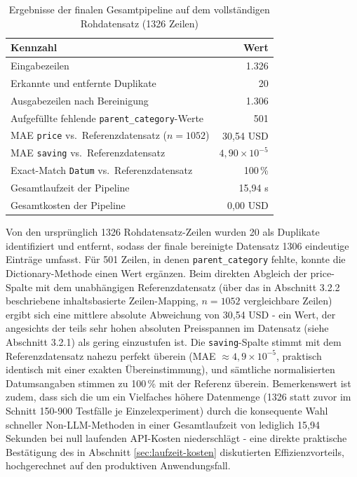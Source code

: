 \begin{table}[htbp]
\centering
\caption{Ergebnisse der finalen Gesamtpipeline auf dem vollständigen Rohdatensatz (1326 Zeilen)}
\label{tab:finale-ergebnisse}
\begin{tabular}{lr}
\toprule
\rowcolor{headerblue}
\textbf{Kennzahl} & \textbf{Wert} \\
\midrule
\rowcolor{lightgray}
Eingabezeilen & 1.326 \\
Erkannte und entfernte Duplikate & 20 \\
\rowcolor{lightgray}
Ausgabezeilen nach Bereinigung & 1.306 \\
Aufgefüllte fehlende \texttt{parent\_category}-Werte & 501 \\
\rowcolor{lightgray}
MAE \texttt{price} vs.\ Referenzdatensatz ($n{=}1052$) & 30{,}54 USD \\
MAE \texttt{saving} vs.\ Referenzdatensatz & $4{,}90 \times 10^{-5}$ \\
\rowcolor{lightgray}
Exact-Match \texttt{Datum} vs.\ Referenzdatensatz & 100\,\% \\
Gesamtlaufzeit der Pipeline & 15{,}94 s \\
\rowcolor{lightgray}
Gesamtkosten der Pipeline & 0{,}00 USD \\
\bottomrule
\end{tabular}
\end{table}

Von den ursprünglich 1326 Rohdatensatz-Zeilen wurden 20 als Duplikate
identifiziert und entfernt, sodass der finale bereinigte Datensatz 1306
eindeutige Einträge umfasst. Für 501 Zeilen, in denen
\texttt{parent\_category} fehlte, konnte die Dictionary-Methode einen Wert
ergänzen. Beim direkten Abgleich der price-Spalte mit dem unabhängigen
Referenzdatensatz (über das in Abschnitt 3.2.2 beschriebene inhaltsbasierte
Zeilen-Mapping, $n = 1052$ vergleichbare Zeilen) ergibt sich eine mittlere
absolute Abweichung von 30{,}54 USD - ein Wert, der angesichts der teils sehr
hohen absoluten Preisspannen im Datensatz (siehe Abschnitt 3.2.1) als gering
einzustufen ist. Die \texttt{saving}-Spalte stimmt mit dem Referenzdatensatz
nahezu perfekt überein (MAE $\approx 4{,}9 \times 10^{-5}$, praktisch
identisch mit einer exakten Übereinstimmung), und sämtliche normalisierten
Datumsangaben stimmen zu 100\,\% mit der Referenz überein. Bemerkenswert ist
zudem, dass sich die um ein Vielfaches höhere Datenmenge (1326 statt zuvor
im Schnitt 150-900 Testfälle je Einzelexperiment) durch die konsequente Wahl
schneller Non-LLM-Methoden in einer Gesamtlaufzeit von lediglich 15{,}94
Sekunden bei null laufenden API-Kosten niederschlägt - eine direkte
praktische Bestätigung des in Abschnitt \ref{sec:laufzeit-kosten}
diskutierten Effizienzvorteils, hochgerechnet auf den produktiven
Anwendungsfall.

